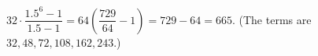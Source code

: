 $32\cdot\dfrac{1.5^6-1}{1.5-1}=64\left(\dfrac{729}{64}-1\right)=729-64=\boxed{665}$. (The terms are $32,48,72,108,162,243$.)
